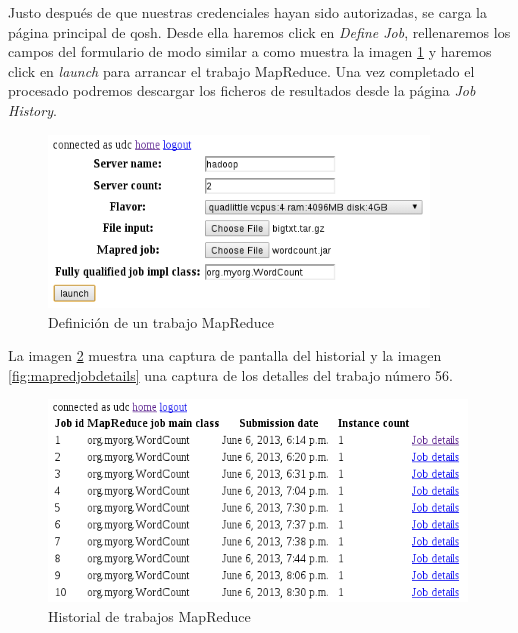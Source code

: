Justo despu\'es de que nuestras credenciales hayan sido autorizadas, se carga la p\'agina principal de qosh. Desde ella haremos click en \emph{Define Job}, rellenaremos los campos del formulario de modo similar a como muestra la imagen \ref{fig:defmapredjob} y haremos click en \emph{launch} para arrancar el trabajo MapReduce. Una vez completado el procesado podremos descargar los ficheros de resultados desde la p\'agina \emph{Job History}. \newline

\begin{figure}[bp]
\begin{center}
\includegraphics[width=0.90\textwidth]{imagenes/046.png}
\caption{Definici\'on de un trabajo MapReduce}
\label{fig:defmapredjob}
\end{center}
\end{figure}

La imagen \ref{fig:mapredjobhistory} muestra una captura de pantalla del historial y la imagen \ref{fig:mapredjobdetails} una captura de los detalles del trabajo n\'umero 56.


\begin{figure}[tbp]
\begin{center}
\includegraphics[width=0.99\textwidth]{imagenes/047.png}
\caption{Historial de trabajos MapReduce}
\label{fig:mapredjobhistory}
\end{center}
\end{figure}


